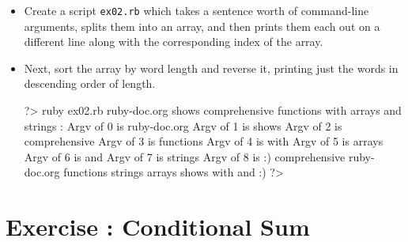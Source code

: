 \documentclass{42-en}
\begin{document}
\begin{itemize}

\item Create a script \texttt{ex02.rb} which takes a sentence worth of command-line arguments, splits them into an array, and then prints them each out on a different line along with the corresponding index of the array.
\item Next, sort the array by word length and reverse it, printing just the words in descending order of length.

\begin{42console}
	?> ruby ex02.rb ruby-doc.org shows comprehensive functions with arrays and strings :\)
	Argv of 0 is ruby-doc.org
	Argv of 1 is shows
	Argv of 2 is comprehensive
	Argv of 3 is functions
	Argv of 4 is with
	Argv of 5 is arrays
	Argv of 6 is and
	Argv of 7 is strings
	Argv of 8 is :)
	comprehensive
	ruby-doc.org
	functions
	strings
	arrays
	shows
	with
	and
	:)
	?>
\end{42console}

\end{itemize}


\chapter{Exercise \exercicenumber: Conditional Sum}

\exnumber{\exercicenumber}

\makeheaderfiles
\end{document}
